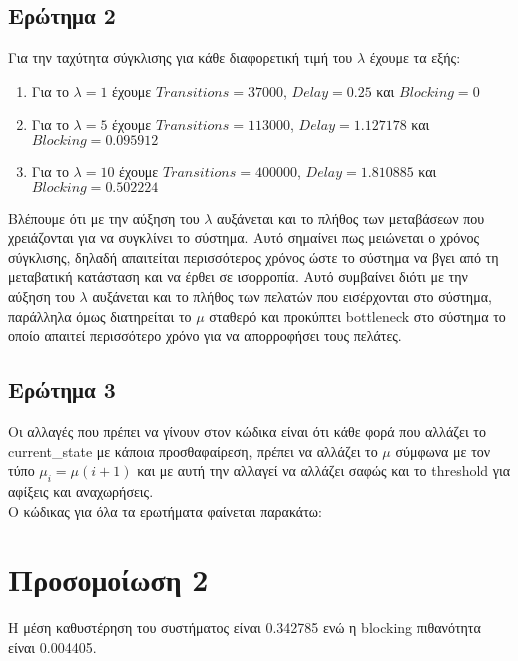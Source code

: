 \documentclass[12pt]{article}
\begin{document}
\subsection{Ερώτημα 2}
Για την ταχύτητα σύγκλισης για κάθε διαφορετική τιμή του $\lambda$
έχουμε τα εξής:

\begin{enumerate}
    \item{}
        Για το $\lambda = 1$ έχουμε $Transitions = 37000$, $Delay = 0.25$ και $Blocking = 0$
    \item{}
        Για το $\lambda = 5$ έχουμε $Transitions = 113000$, $Delay = 1.127178$ και $Blocking = 0.095912$
    \item{}
        Για το $\lambda = 10$ έχουμε $Transitions = 400000$, $Delay = 1.810885$ και $Blocking = 0.502224$
\end{enumerate}

Βλέπουμε ότι με την αύξηση του $\lambda$ αυξάνεται και το πλήθος των
μεταβάσεων που χρειάζονται για να συγκλίνει το σύστημα. Αυτό σημαίνει
πως μειώνεται ο χρόνος σύγκλισης, δηλαδή απαιτείται περισσότερος χρόνος 
ώστε το σύστημα να βγει από τη μεταβατική κατάσταση και να έρθει σε 
ισορροπία. Αυτό συμβαίνει διότι με την αύξηση του $\lambda$ αυξάνεται
και το πλήθος των πελατών που εισέρχονται στο σύστημα, παράλληλα όμως
διατηρείται το $\mu$ σταθερό και προκύπτει bottleneck στο σύστημα το 
οποίο απαιτεί περισσότερο χρόνο για να απορροφήσει τους πελάτες.


\subsection{Ερώτημα 3}
Οι αλλαγές που πρέπει να γίνουν στον κώδικα είναι ότι κάθε φορά που 
αλλάζει το current\_state με κάποια προσθαφαίρεση, πρέπει να αλλάζει 
το $\mu$ σύμφωνα με τον τύπο $\mu_i = \mu (i + 1)$ και με αυτή την 
αλλαγεί να αλλάζει σαφώς και το threshold για αφίξεις και αναχωρήσεις.\\

Ο κώδικας για όλα τα ερωτήματα φαίνεται παρακάτω:



\section{Προσομοίωση 2}

Η μέση καθυστέρηση του συστήματος είναι 0.342785 ενώ η blocking πιθανότητα
είναι 0.004405.
\end{document}
